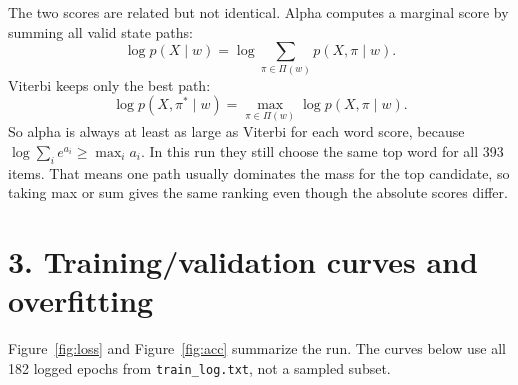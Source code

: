 \documentclass[11pt]{article}
\begin{document}
The two scores are related but not identical.
Alpha computes a marginal score by summing all valid state paths:
\[
\log p(X\mid w) = \log \sum_{\pi \in \Pi(w)} p(X,\pi\mid w).
\]
Viterbi keeps only the best path:
\[
\log p(X,\pi^*\mid w) = \max_{\pi \in \Pi(w)} \log p(X,\pi\mid w).
\]
So alpha is always at least as large as Viterbi for each word score, because
\(\log\sum_i e^{a_i} \ge \max_i a_i\).
In this run they still choose the same top word for all 393 items.
That means one path usually dominates the mass for the top candidate, so taking max or sum gives the same ranking even though the absolute scores differ.

\section*{3. Training/validation curves and overfitting}
Figure~\ref{fig:loss} and Figure~\ref{fig:acc} summarize the run.
The curves below use all 182 logged epochs from \texttt{train\_log.txt}, not a sampled subset.
\end{document}
